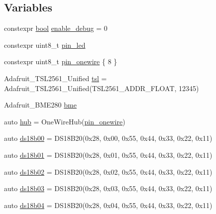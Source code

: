 \subsection*{Variables}
\begin{DoxyCompactItemize}
\item 
constexpr \hyperlink{stdbool_8h_abb452686968e48b67397da5f97445f5b}{bool} \hyperlink{OWH__DS18B20__asInterface__SensorStation_8ino_a10e1cfbd99adf655995798f1db9bfbed}{enable\-\_\-debug} = 0
\item 
constexpr uint8\-\_\-t \hyperlink{OWH__DS18B20__asInterface__SensorStation_8ino_add5a7eb759d22b21f8875663ed2c1528}{pin\-\_\-led}
\item 
constexpr uint8\-\_\-t \hyperlink{OWH__DS18B20__asInterface__SensorStation_8ino_ad4f51a015485d98cc3a8a79f41a81027}{pin\-\_\-onewire} \{ 8 \}
\item 
Adafruit\-\_\-\-T\-S\-L2561\-\_\-\-Unified \hyperlink{OWH__DS18B20__asInterface__SensorStation_8ino_a34dc1ffbb166b7afbf402f717b871f77}{tsl} = Adafruit\-\_\-\-T\-S\-L2561\-\_\-\-Unified(T\-S\-L2561\-\_\-\-A\-D\-D\-R\-\_\-\-F\-L\-O\-A\-T, 12345)
\item 
Adafruit\-\_\-\-B\-M\-E280 \hyperlink{OWH__DS18B20__asInterface__SensorStation_8ino_a2871708605796e3f6cfa9cd9328daff3}{bme}
\item 
auto \hyperlink{OWH__DS18B20__asInterface__SensorStation_8ino_a3beb275f1ae5db0a79499403dd2fbff8}{hub} = One\-Wire\-Hub(\hyperlink{OWH__DS2438__battMon__Test_8ino_ad4f51a015485d98cc3a8a79f41a81027}{pin\-\_\-onewire})
\item 
auto \hyperlink{OWH__DS18B20__asInterface__SensorStation_8ino_a32a543547840c79cf235685d5cef861b}{ds18b00} = D\-S18\-B20(0x28, 0x00, 0x55, 0x44, 0x33, 0x22, 0x11)
\item 
auto \hyperlink{OWH__DS18B20__asInterface__SensorStation_8ino_a211d281f65b23c68014c5ade33ad8046}{ds18b01} = D\-S18\-B20(0x28, 0x01, 0x55, 0x44, 0x33, 0x22, 0x11)
\item 
auto \hyperlink{OWH__DS18B20__asInterface__SensorStation_8ino_a65c9858825a2360040b6c3d8e99a6984}{ds18b02} = D\-S18\-B20(0x28, 0x02, 0x55, 0x44, 0x33, 0x22, 0x11)
\item 
auto \hyperlink{OWH__DS18B20__asInterface__SensorStation_8ino_a20efe680cbc012b4e01ddb1e350cb99b}{ds18b03} = D\-S18\-B20(0x28, 0x03, 0x55, 0x44, 0x33, 0x22, 0x11)
\item 
auto \hyperlink{OWH__DS18B20__asInterface__SensorStation_8ino_ac75e3c928eeb0a635880c9751a6b0791}{ds18b04} = D\-S18\-B20(0x28, 0x04, 0x55, 0x44, 0x33, 0x22, 0x11)

\end{DoxyCompactItemize}
